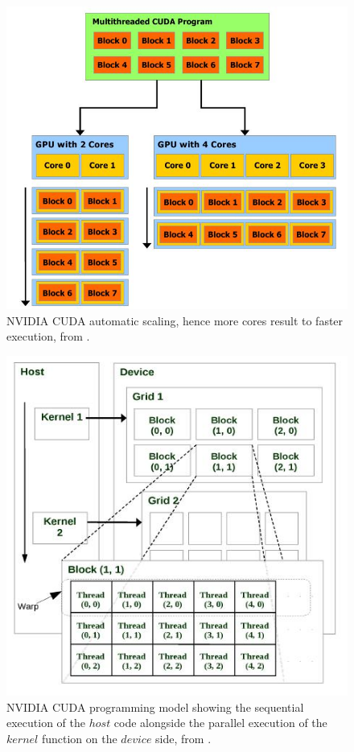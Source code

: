 \documentclass{svmultm}
\begin{document}
	\begin{figure}
		\centering
		\includegraphics[scale=.5]{figures/cuda-scaling.jpeg} 
		\caption{NVIDIA CUDA automatic scaling, hence more cores
result to faster execution, from \cite{cudaguide}.}
		\label{cuda_scale}
	\end{figure}
	
	\begin{figure}
		\centering
		\includegraphics[scale=.6]{figures/cuda-model.jpeg} 
		\caption{NVIDIA CUDA programming model showing the sequential execution of the $host$ code alongside the parallel execution of the $kernel$ function on the $device$ side, from \cite{amgpu}.}
		\label{cuda_model}
	\end{figure}
\end{document}
